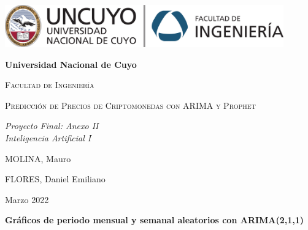 \documentclass[a4paper,10pt]{article}
\begin{document}
\begin{titlepage}
\centering
{\includegraphics[width=0.9\textwidth]{fing_uncuyo}\par}
\vspace{1cm}
{\bfseries\LARGE Universidad Nacional de Cuyo \par}
\vspace{1cm}
{\scshape\Large Facultad de Ingeniería \par}
\vspace{3cm}
{\scshape\Huge Predicción de Precios de Criptomonedas con ARIMA y Prophet \par}
\vspace{3cm}
{\itshape\Large Proyecto Final: Anexo II\\Inteligencia Artificial I \par}
\vfill
{\Large MOLINA, Mauro \par}
{\Large FLORES, Daniel Emiliano \par}
\vfill
{\Large Marzo 2022 \par}
\end{titlepage}

\newpage

\textbf{\large Gráficos de periodo mensual y semanal aleatorios con ARIMA(2,1,1)}
\end{document}
